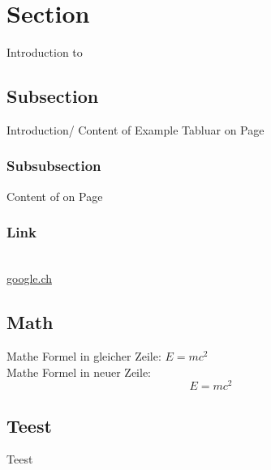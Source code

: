 

\section{Section}
\label{sec:Section}
Introduction to 

\subsection{Subsection}
\label{subsec:subsection}
Introduction/ Content of 
Example Tabluar on Page \pageref{tab:example tabular}

\subsubsection{Subsubsection}
\label{subsubsec:subsubsection}
Content of  on Page \pageref{sec:Section}

\subsubsection{Link}
 \\
\href{www.google.ch}{google.ch} %

\subsection{Math}

Mathe Formel in gleicher Zeile: $E=mc^2$\\

Mathe Formel in neuer Zeile: $$E=mc^2$$

\subsection{Teest}

Teest